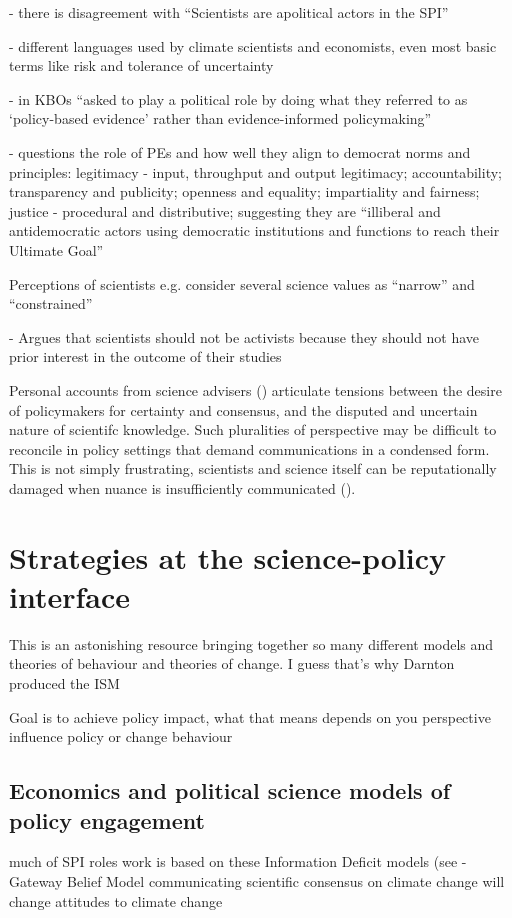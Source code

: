 \cite{JagannathanEtAl2023} - there is disagreement with ``Scientists are apolitical actors in the SPI''

\cite{Makin2024} - different languages used by climate scientists and economists, even most basic terms like risk and tolerance of uncertainty

\cite{MacKillopCDD2023} - in KBOs ``asked to play a political role by doing what they referred to as `policy-based evidence' rather than evidence-informed policymaking''

\cite{vonMalmborg2024strategies} - questions the role of PEs and how well they align to democrat norms and principles: legitimacy - input, throughput and output legitimacy; accountability; transparency and publicity; openness and equality; impartiality and fairness; justice - procedural and distributive; suggesting they are ``illiberal and antidemocratic actors using democratic institutions and functions to reach their Ultimate Goal''

Perceptions of scientists e.g. \cite{McNiePS2017} consider several science values as ``narrow'' and ``constrained''

\cite{Buntgen2024} - Argues that scientists should not be activists because they should not have prior interest in the outcome of their studies

Personal accounts from science advisers (\cite{Stirling2010,Hicks2024}) articulate  tensions between the desire of policymakers for certainty and consensus, and the disputed and uncertain nature of scientifc knowledge. Such pluralities of perspective may be difficult to reconcile in policy settings that demand communications in a condensed form. This is not simply frustrating, scientists and science itself can be reputationally damaged when nuance is insufficiently communicated (\cite{Stirling2010,OjanenBKP2021}). 

\section{Strategies at the science-policy interface}\label{sec:litstrat}
\cite{Darnton2008} This is an astonishing resource bringing together so many different models and theories of behaviour and theories of change. I guess that's why Darnton produced the ISM \cite{DarntonH2013}


Goal is to achieve policy impact, what that means depends on you perspective
influence policy or change behaviour

\subsection{Economics and political science models of policy engagement}
much of SPI roles work is based on these
Information Deficit models (see \cite{Darnton2008}
\cite{vanderLindenLFM2015,vanderLinden2021} - Gateway Belief Model  communicating scientific consensus on climate change will change attitudes to climate change

